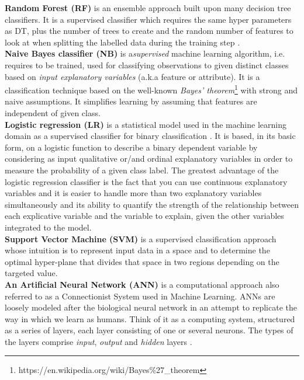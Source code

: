 \textbf{Random Forest (RF)}\cite{Be01} is an ensemble approach built upon many decision tree classifiers. It is a supervised classifier which requires the same hyper parameters as DT, plus the number of trees to create and the random number of features to look at when splitting the labelled data during the training step \cite{Be01}.\\
\textbf{ Naive Bayes classifier (NB) }\cite{Ka17} is a\emph{supervised} machine learning algorithm, i.e. requires to be trained, used for classifying observations to given distinct classes based on \emph{input explanatory variables} (a.k.a feature or attribute).
It is a classification technique based on the well-known \emph{Bayes’ theorem}\footnote{https://en.wikipedia.org/wiki/Bayes\%27\_theorem} with strong and naive assumptions. It simplifies learning by assuming that features are independent of given class.\\
\textbf{Logistic regression (LR)} \cite{Ph88} is a statistical model used in the machine learning domain as a supervised classifier for binary classification \cite{uddin2019comparing}. 
It is based, in its basic form, on a logistic function to describe a binary dependent variable\cite{wang2014support,de2018binary} by considering as input 
qualitative or/and ordinal explanatory variables  in order to measure the probability of a given class label. The greatest advantage  of the logistic regression
classifier is the fact that you can use continuous explanatory variables and it is easier to handle more than two explanatory variables simultaneously and its ability to quantify the strength of the relationship between each explicative variable and the variable to explain, given the other variables integrated to the model.\\
\textbf{Support Vector Machine (SVM)} \cite{Ev01} is a supervised classification approach whose intuition is to represent input data in a space and to determine the optimal hyper-plane that divides that space in two regions depending on the targeted value.\\
\textbf{An Artificial Neural Network (ANN)} \cite{Me19} is a computational approach also referred to as a Connectionist System used in Machine Learning. ANNs are loosely modeled after the biological neural network in an attempt to replicate the way in which we learn as humans. Think of it as a computing system, structured as a series of layers, each layer consisting of one or several neurons. The types of the layers comprise \emph{input}, \emph{output} and \emph{hidden} layers \cite{anderson1972simple,raschka2015python}.



